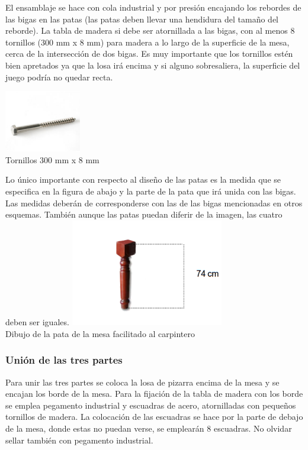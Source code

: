 El ensamblaje se hace con cola industrial y por presión encajando los rebordes de las bigas en las patas (las patas deben llevar una hendidura del tamaño del reborde).
La tabla de madera si debe ser atornillada a las bigas, con al menos 8 tornillos  (300 mm x 8 mm) para madera a lo largo de la superficie de la mesa,  cerca de la intersección de dos bigas. 
Es muy importante que los tornillos estén bien apretados ya que la losa irá encima y si alguno sobresaliera, la superficie del juego podría no quedar recta. 

\begin{center}
    		\includegraphics[width=0.25\textwidth]{_42-100.jpg}
		 \\ \small {Tornillos  300 mm x 8 mm}
	\end{center}

\begin{center}

Lo único importante con respecto al diseño de las patas es la medida que se especifica en la figura de abajo y la parte de la pata que irá unida con las bigas. Las medidas deberán de corresponderse con las de las bigas mencionadas en otros esquemas.
También aunque las patas puedan diferir de la imagen, las cuatro deben ser iguales.   
 		\includegraphics[width=0.5\textwidth]{Pata.png}
		 \\ \small {Dibujo de la pata de la mesa facilitado al carpintero}
	\end{center}


\subsubsection {Unión de las tres partes}

Para unir las tres partes se coloca la losa de pizarra encima de la mesa y se encajan los borde de la mesa. Para la fijación de la tabla de madera con los borde se emplea pegamento industrial y escuadras de acero, atornilladas con pequeños tornillos de madera.
La colocación de las escuadras  se hace por la parte de debajo de la mesa, donde estas no puedan verse, se emplearán 8 escuadras. No olvidar sellar también con pegamento industrial. 


